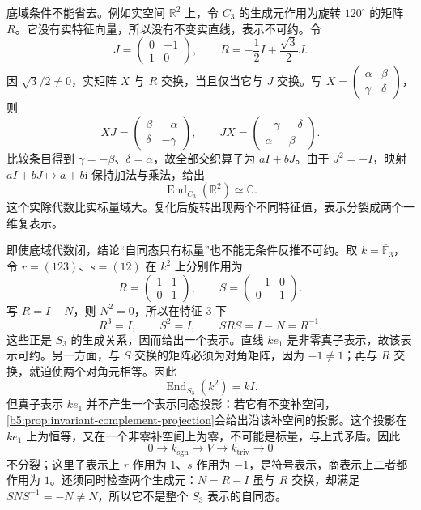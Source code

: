 底域条件不能省去。例如实空间 \(\mathbb R^2\) 上，令 \(C_3\) 的生成元作用为旋转 \(120^\circ\) 的矩阵 \(R\)。它没有实特征向量，所以没有不变实直线，表示不可约。令
\[
	J=\begin{pmatrix}0&-1\\1&0\end{pmatrix},\qquad
	R=-\dfrac12I+\dfrac{\sqrt3}{2}J.
\]
因 \(\sqrt3/2\ne0\)，实矩阵 \(X\) 与 \(R\) 交换，当且仅当它与 \(J\) 交换。写 \(X=\begin{pmatrix}\alpha&\beta\\\gamma&\delta\end{pmatrix}\)，则
\[
	XJ=\begin{pmatrix}\beta&-\alpha\\\delta&-\gamma\end{pmatrix},\qquad
	JX=\begin{pmatrix}-\gamma&-\delta\\\alpha&\beta\end{pmatrix}.
\]
比较条目得到 \(\gamma=-\beta\)、\(\delta=\alpha\)，故全部交织算子为 \(aI+bJ\)。由于 \(J^2=-I\)，映射 \(aI+bJ\mapsto a+b\mathrm i\) 保持加法与乘法，给出
\[
	\operatorname{End}_{C_3}(\mathbb R^2)\simeq\mathbb C.
\]
这个实除代数比实标量域大。复化后旋转出现两个不同特征值，表示分裂成两个一维复表示。

\ProseParagraphBreak
即使底域代数闭，结论“自同态只有标量”也不能无条件反推不可约。取 \(k=\overline{\mathbb F}_3\)，令 \(r=(123)\)、\(s=(12)\) 在 \(k^2\) 上分别作用为
\[
	R=\begin{pmatrix}1&1\\0&1\end{pmatrix},\qquad
	S=\begin{pmatrix}-1&0\\0&1\end{pmatrix}.
\]
写 \(R=I+N\)，则 \(N^2=0\)，所以在特征 \(3\) 下
\[
	R^3=I,\qquad S^2=I,\qquad SRS=I-N=R^{-1}.
\]
这些正是 \(S_3\) 的生成关系，因而给出一个表示。直线 \(ke_1\) 是非零真子表示，故该表示可约。另一方面，与 \(S\) 交换的矩阵必须为对角矩阵，因为 \(-1\ne1\)；再与 \(R\) 交换，就迫使两个对角元相等。因此
\[
	\operatorname{End}_{S_3}(k^2)=kI.
\]
但真子表示 \(ke_1\) 并不产生一个表示同态投影：若它有不变补空间，\cref{b5:prop:invariant-complement-projection}会给出沿该补空间的投影。这个投影在 \(ke_1\) 上为恒等，又在一个非零补空间上为零，不可能是标量，与上式矛盾。因此
\[
	0\longrightarrow k_{\mathrm{sgn}}\longrightarrow V \longrightarrow k_{\mathrm{triv}}\longrightarrow0
\]
不分裂；这里子表示上 \(r\) 作用为 \(1\)、\(s\) 作用为 \(-1\)，是符号表示，商表示上二者都作用为 \(1\)。还须同时检查两个生成元：\(N=R-I\) 虽与 \(R\) 交换，却满足 \(SNS^{-1}=-N\ne N\)，所以它不是整个 \(S_3\) 表示的自同态。

